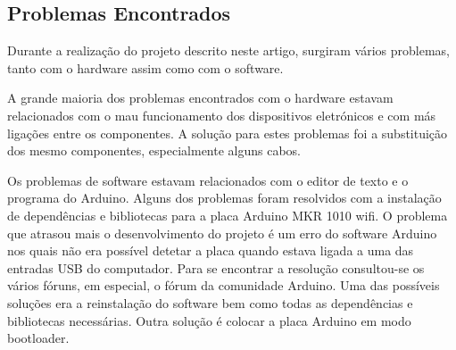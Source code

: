 \documentclass[conference]{IEEEtran}
\begin{document}
\subsection{Problemas Encontrados}

Durante a realização do projeto descrito neste artigo, surgiram vários problemas, tanto com o hardware 
assim como com o software.

A grande maioria dos problemas encontrados com o hardware estavam relacionados com o mau funcionamento dos 
dispositivos eletrónicos e com más ligações entre os componentes. A solução para estes problemas foi a 
substituição dos mesmo componentes, especialmente alguns cabos.

Os problemas de software estavam relacionados com o editor de texto e o programa do Arduino. Alguns dos problemas 
foram resolvidos com a instalação de dependências e bibliotecas para a placa Arduino MKR 1010 wifi. 
O problema que atrasou mais o desenvolvimento do projeto é um erro do software Arduino nos quais não era possível 
detetar a placa quando estava ligada a uma das entradas USB do computador. Para se encontrar a resolução 
consultou-se os vários fóruns, em especial, o fórum da comunidade Arduino. Uma das possíveis soluções era a 
reinstalação do software bem como todas as dependências e bibliotecas necessárias. Outra solução é colocar a 
placa Arduino em modo bootloader. \cite{arduinoport}



\end{document}
